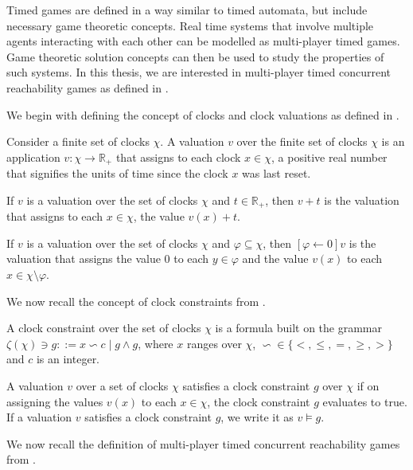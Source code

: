 Timed games are defined in a way similar to timed automata, but include necessary game theoretic concepts. Real time systems that involve multiple agents interacting with each other can be modelled as multi-player timed games. Game theoretic solution concepts can then be used to study the properties of such systems. In this thesis, we are interested in multi-player timed concurrent reachability games as defined in \cite{BBM-concur10,BBM-report}.

We begin with defining the concept of clocks and clock valuations as defined in \cite{1,BBM-concur10,BBM-report}.

\begin{definition}
Consider a finite set of clocks $\chi$. A valuation $v$ over the finite set of clocks $\chi$ is an application $v: \chi \rightarrow \mathbb{R}_{+}$ that assigns to each clock $x \in \chi$, a positive real number that signifies the units of time since the clock $x$ was last reset.
\end{definition}

If $v$ is a valuation over the set of clocks $\chi$ and $t \in \mathbb{R}_{+}$, then $v + t$ is the valuation that assigns to each $x \in \chi$, the value $v(x) + t$.

If $v$ is a valuation over the set of clocks $\chi$ and $\varphi \subseteq \chi$, then $[\varphi \leftarrow 0]v$ is the valuation that assigns the value $0$ to each $y \in \varphi$ and the value $v(x)$ to each $x \in \chi \setminus \varphi$.

We now recall the concept of clock constraints from \cite{1,BBM-concur10,BBM-report}.

\begin{definition}
A clock constraint over the set of clocks $\chi$ is a formula built on the grammar $\zeta(\chi) \ni g ::= x \backsim c \; \vert \; g \wedge g$, where $x$ ranges over $\chi$, $\backsim \in \lbrace <, \leq, =, \geq, > \rbrace$ and $c$ is an integer.
\end{definition}

A valuation $v$ over a set of clocks $\chi$ satisfies a clock constraint $g$ over $\chi$ if on assigning the values $v(x)$ to each $x \in \chi$, the clock constraint $g$ evaluates to true. If a valuation $v$ satisfies a clock constraint $g$, we write it as $v \models g$.

We now recall the definition of multi-player timed concurrent reachability games from \cite{BBM-concur10,BBM-report}.

